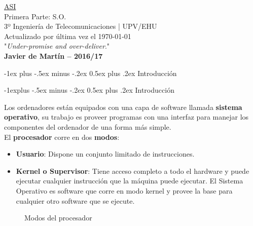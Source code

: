 \documentclass[10pt,portrait, twocolumn]{article}
\makeatletter
\renewcommand{\section}{\@startsection{section}{1}{0mm}%
                                {-1ex plus -.5ex minus -.2ex}%
                                {0.5ex plus .2ex}%
                                {\normalfont\large\bfseries}}
\renewcommand{\subsection}{\@startsection{subsection}{2}{0mm}%
                                {-1explus -.5ex minus -.2ex}%
                                {0.5ex plus .2ex}%
                                {\normalfont\normalsize\bfseries}}
\makeatother
\begin{document}
\begin{framed}
	\begin{center}
    	\Large{\underline{ASI}} \\
	\large{Primera Parte: S.O.} \\
    	\scriptsize{3º Ingeniería de Telecomunicaciones | UPV/EHU}\\
     	Actualizado por última vez el \today \\
     	"\textsl{Under-promise and over-deliver}." \\
     	\small{\textbf{Javier de Martín -- 2016/17}}
	\end{center}
\end{framed}




\section{Introducción}

\subsection{Introducción}


Los ordenadores están equipados con una capa de software llamada \textbf{sistema operativo}, su trabajo es proveer programas con una interfaz para manejar los componentes del ordenador de una forma más simple.\\

El \textbf{procesador} corre en dos \textbf{modos}:

	\begin{itemize}
	\item \textbf{Usuario}: Dispone un conjunto limitado de instrucciones.
	\item \textbf{Kernel o Supervisor}: Tiene acceso completo a todo el hardware y puede ejecutar cualquier instrucción que la máquina puede ejecutar. El Sistema Operativo es software que corre en modo kernel y provee la base para cualquier otro software que se ejecute.
	\end{itemize}

\begin{figure}[h]
	\centering
      \caption{Modos del procesador}
  \end{figure}
\end{document}
